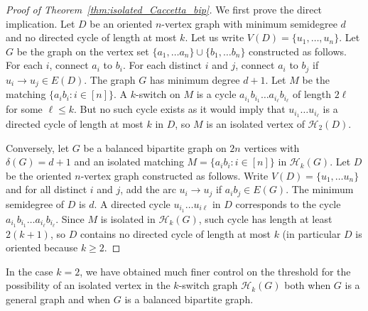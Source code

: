 \documentclass[11pt,a4paper]{article}
\theoremstyle{definition}
\begin{document}
\begin{proof}[Proof of Theorem~\ref{thm:isolated_Caccetta_bip}]
  We first prove the direct implication. Let $D$ be an oriented $n$-vertex graph with
  minimum semidegree $d$ and no directed cycle of length at most $k$. Let us
  write $V(D) = \{u_1, \dots, u_n\}$. Let $G$ be the graph on the vertex set
  $\{a_1, \dots a_n\} \cup \{b_1, \dots b_n\}$ constructed as follows. For each
  $i$, connect $a_i$ to $b_i$. For each distinct $i$ and $j$, connect $a_i$ to
  $b_j$ if $u_i \to u_j \in E(D)$. The graph $G$ has minimum degree $d+1$. Let
  $M$ be the matching $\{a_ib_i \colon i \in [n]\}$. A $k$-switch on $M$ is a
  cycle $a_{i_1}b_{i_1} \dots a_{i_\ell}b_{i_\ell}$ of length $2\ell$ for some
  $\ell \le k$. But no such cycle exists as it would imply that $u_{i_1}\dots
  u_{i_\ell}$ is a directed cycle of length at most $k$ in $D$, so $M$ is an
  isolated vertex of $\mathcal H_2(D)$.

  Conversely, let $G$ be a balanced bipartite graph on $2n$ vertices with
  $\delta(G) = d+1$ and an isolated matching $M = \{a_ib_i \colon i \in [n]\}$
  in $\mathcal H_k(G)$. Let $D$ be the oriented $n$-vertex graph constructed as
  follows. Write $V(D) = \{u_1, \dots u_n\}$ and for all distinct $i$ and $j$,
  add the arc $u_i \to u_j$ if $a_ib_j \in E(G)$. The minimum semidegree of $D$
  is $d$. A directed cycle $u_{i_1} \dots u_{i\ell}$ in $D$ corresponds to the
  cycle $a_{i_1}b_{i_1} \dots a_{i_\ell}b_{i_\ell}$. Since $M$ is isolated in
  $\mathcal H_k(G)$, such cycle has length at least $2(k+1)$, so $D$ contains no
  directed cycle of length at most $k$ (in particular $D$ is oriented because
  $k \ge 2$.
\end{proof}

In the case $k=2$, we have obtained much finer control on the threshold for the possibility of an isolated vertex in the $k$-switch graph $\mathcal H_k(G)$ both when $G$ is a general graph and when $G$ is a balanced bipartite graph.
\end{document}
